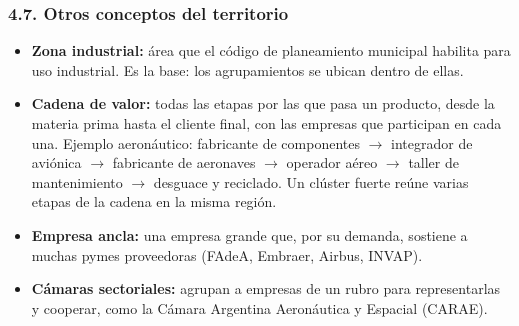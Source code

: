\subsubsection*{4.7. Otros conceptos del territorio}
\begin{itemize}
  \item \textbf{Zona industrial:} área que el código de planeamiento municipal habilita para
        uso industrial. Es la base: los agrupamientos se ubican dentro de ellas.
  \item \textbf{Cadena de valor:} todas las etapas por las que pasa un producto, desde la
        materia prima hasta el cliente final, con las empresas que participan en cada una.
        Ejemplo aeronáutico: fabricante de componentes $\rightarrow$ integrador de aviónica
        $\rightarrow$ fabricante de aeronaves $\rightarrow$ operador aéreo $\rightarrow$
        taller de mantenimiento $\rightarrow$ desguace y reciclado. Un clúster fuerte reúne
        varias etapas de la cadena en la misma región.
  \item \textbf{Empresa ancla:} una empresa grande que, por su demanda, sostiene a muchas
        pymes proveedoras (FAdeA, Embraer, Airbus, INVAP).
  \item \textbf{Cámaras sectoriales:} agrupan a empresas de un rubro para representarlas y
        cooperar, como la Cámara Argentina Aeronáutica y Espacial (CARAE).
\end{itemize}

